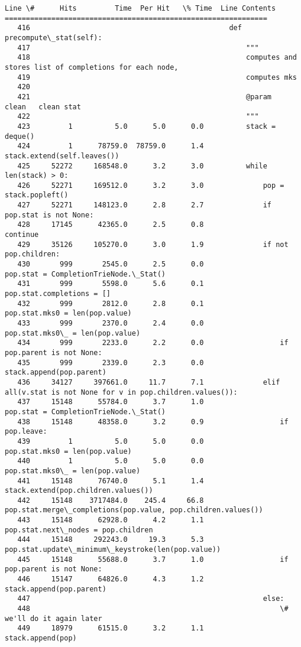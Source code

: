 \documentclass[11pt]{article}
\begin{document}
\begin{Verbatim}[commandchars=\\\{\}]
Line \#      Hits         Time  Per Hit   \% Time  Line Contents
==============================================================
   416                                               def precompute\_stat(self):
   417                                                   """
   418                                                   computes and stores list of completions for each node,
   419                                                   computes mks
   420                                           
   421                                                   @param      clean   clean stat
   422                                                   """
   423         1          5.0      5.0      0.0          stack = deque()
   424         1      78759.0  78759.0      1.4          stack.extend(self.leaves())
   425     52272     168548.0      3.2      3.0          while len(stack) > 0:
   426     52271     169512.0      3.2      3.0              pop = stack.popleft()
   427     52271     148123.0      2.8      2.7              if pop.stat is not None:
   428     17145      42365.0      2.5      0.8                  continue
   429     35126     105270.0      3.0      1.9              if not pop.children:
   430       999       2545.0      2.5      0.0                  pop.stat = CompletionTrieNode.\_Stat()
   431       999       5598.0      5.6      0.1                  pop.stat.completions = []
   432       999       2812.0      2.8      0.1                  pop.stat.mks0 = len(pop.value)
   433       999       2370.0      2.4      0.0                  pop.stat.mks0\_ = len(pop.value)
   434       999       2233.0      2.2      0.0                  if pop.parent is not None:
   435       999       2339.0      2.3      0.0                      stack.append(pop.parent)
   436     34127     397661.0     11.7      7.1              elif all(v.stat is not None for v in pop.children.values()):
   437     15148      55784.0      3.7      1.0                  pop.stat = CompletionTrieNode.\_Stat()
   438     15148      48358.0      3.2      0.9                  if pop.leave:
   439         1          5.0      5.0      0.0                      pop.stat.mks0 = len(pop.value)
   440         1          5.0      5.0      0.0                      pop.stat.mks0\_ = len(pop.value)
   441     15148      76740.0      5.1      1.4                  stack.extend(pop.children.values())
   442     15148    3717484.0    245.4     66.8                  pop.stat.merge\_completions(pop.value, pop.children.values())
   443     15148      62928.0      4.2      1.1                  pop.stat.next\_nodes = pop.children
   444     15148     292243.0     19.3      5.3                  pop.stat.update\_minimum\_keystroke(len(pop.value))
   445     15148      55688.0      3.7      1.0                  if pop.parent is not None:
   446     15147      64826.0      4.3      1.2                      stack.append(pop.parent)
   447                                                       else:
   448                                                           \# we'll do it again later
   449     18979      61515.0      3.2      1.1                  stack.append(pop)



    \end{Verbatim}
\end{document}
